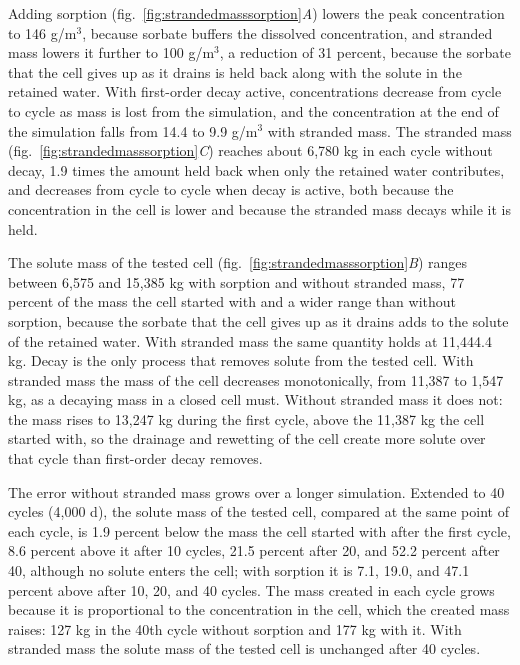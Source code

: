 Adding sorption (fig.~\ref{fig:strandedmasssorption}\textit{A}) lowers the peak concentration to 146 g/m$^3$, because sorbate buffers the dissolved concentration, and stranded mass lowers it further to 100 g/m$^3$, a reduction of 31 percent, because the sorbate that the cell gives up as it drains is held back along with the solute in the retained water. With first-order decay active, concentrations decrease from cycle to cycle as mass is lost from the simulation, and the concentration at the end of the simulation falls from 14.4 to 9.9 g/m$^3$ with stranded mass. The stranded mass (fig.~\ref{fig:strandedmasssorption}\textit{C}) reaches about 6,780 \si{\kilo\gram} in each cycle without decay, 1.9 times the amount held back when only the retained water contributes, and decreases from cycle to cycle when decay is active, both because the concentration in the cell is lower and because the stranded mass decays while it is held.

The solute mass of the tested cell (fig.~\ref{fig:strandedmasssorption}\textit{B}) ranges between 6,575 and 15,385 \si{\kilo\gram} with sorption and without stranded mass, 77 percent of the mass the cell started with and a wider range than without sorption, because the sorbate that the cell gives up as it drains adds to the solute of the retained water. With stranded mass the same quantity holds at 11,444.4 \si{\kilo\gram}. Decay is the only process that removes solute from the tested cell. With stranded mass the mass of the cell decreases monotonically, from 11,387 to 1,547 \si{\kilo\gram}, as a decaying mass in a closed cell must. Without stranded mass it does not: the mass rises to 13,247 \si{\kilo\gram} during the first cycle, above the 11,387 \si{\kilo\gram} the cell started with, so the drainage and rewetting of the cell create more solute over that cycle than first-order decay removes.

The error without stranded mass grows over a longer simulation. Extended to 40 cycles (4,000 d), the solute mass of the tested cell, compared at the same point of each cycle, is 1.9 percent below the mass the cell started with after the first cycle, 8.6 percent above it after 10 cycles, 21.5 percent after 20, and 52.2 percent after 40, although no solute enters the cell; with sorption it is 7.1, 19.0, and 47.1 percent above after 10, 20, and 40 cycles. The mass created in each cycle grows because it is proportional to the concentration in the cell, which the created mass raises: 127 \si{\kilo\gram} in the 40th cycle without sorption and 177 \si{\kilo\gram} with it. With stranded mass the solute mass of the tested cell is unchanged after 40 cycles.

